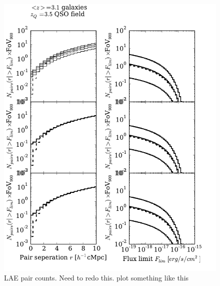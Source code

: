 \documentclass[useAMS,usenatbib,twocolumn]{mn2e}
\begin{document}
\begin{figure}
 \begin{center}
  \includegraphics[angle=0,width=\columnwidth]{figure/LAE_pair_counts.pdf}
  \caption{LAE pair counts. Need to redo this. plot something like this}
 \end{center}
\end{figure}
\end{document}
